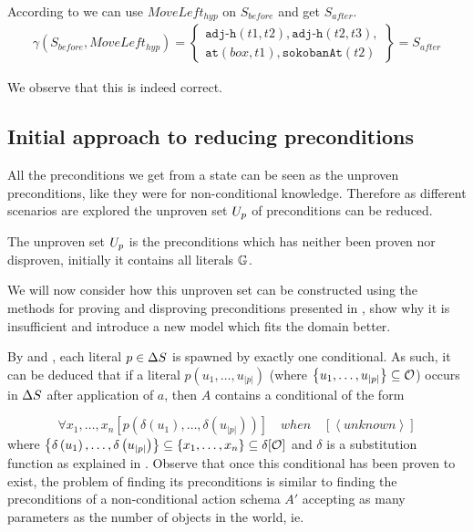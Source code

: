 \documentclass[\master/Master.tex]{subfiles}
\begin{document}
\begin{example}
    According to  we can use $MoveLeft_{hyp}$ on $S_{before}$ and get $S_{after}$.
    \begin{align*}
    &\gamma(S_{before},MoveLeft_{hyp}) =
        \left\{
            \begin{gathered}
                \texttt{adj-h}(t1, t2), \texttt{adj-h}(t2, t3), \\
                \texttt{at}(box,t1), \texttt{sokobanAt}(t2)
            \end{gathered}
        \right\}
        = S_{after}
    &
    \end{align*}

    We observe that this is indeed correct.
\end{example}

\subsection{Initial approach to reducing preconditions}\label{ssec:ca:init-approach}

All the preconditions we get from a state can be seen as the unproven preconditions, like they were for non-conditional knowledge.
Therefore as different scenarios are explored the unproven set $U_p$ of preconditions can be reduced.

\begin{definition}
The unproven set $U_p$ is the preconditions which has neither been proven nor disproven, initially it contains all  literals $\mathbb{G}$.
\end{definition}

We will now consider how this unproven set can be constructed using the methods for proving and disproving preconditions presented in , show why it is insufficient and introduce a new model which fits the domain better.

By  and , each literal $p \in \Delta S$ is spawned by exactly one conditional. As such, it can be deduced that if a literal $p\left(u_1, \dots, u_{|p|}\right)$ (where $\left\{u_1, \dots, u_{|p|}\right\} \subseteq \mathcal{O}$) occurs in $\Delta S$ after application of $a$, then $A$ contains a conditional of the form

\begin{equation*}
    \forall x_1, \dots, x_n 
        \left[ p\left(\delta\left(u_1\right), \dots, \delta \left(u_{|p|}\right) \right) \right] \quad when \quad 
        \left[ \left<unknown\right> \right]
\end{equation*}
where $\left\{\delta \left( u_1 \right), \dots, \delta \left(u_{|p|} \right) \right\} \subseteq \left\{ x_1, \dots, x_n \right\} \subseteq \delta [\mathcal{O}]$ and $\delta$ is a substitution function as explained in . Observe that once this conditional has been proven to exist, the problem of finding its preconditions is similar to finding the preconditions of a non-conditional action schema $A'$ accepting as many parameters as the number of objects in the world, ie. 
\end{document}

